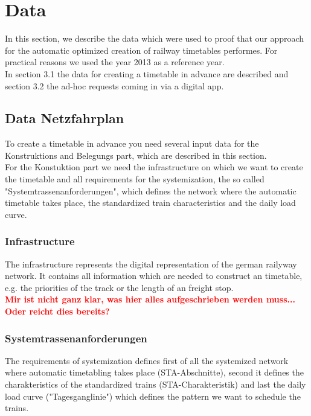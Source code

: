 \section{Data}
\label{chap:data}
In this section, we describe the data which were used to proof that our approach for the automatic optimized creation of railway timetables performes. For practical reasons we used the year 2013 as a reference year.\\
In section 3.1 the data for creating a timetable in advance are described and section 3.2 the ad-hoc requests coming in via a digital app.

\subsection{Data Netzfahrplan}
\label{chap:dataFinVe}
To create a timetable in advance you need several input data for the Konstruktions and Belegungs part, which are described in this section. \\
For the Konstuktion part we need the infrastructure on which we want to create the timetable and all requirements for the systemization, the so called "Systemtrassenanforderungen", which defines the network where the automatic timetable takes place, the standardized train characteristics and the daily load curve. 

\subsubsection{Infrastructure}
The infrastructure represents the digital representation of the german railyway network. It contains all information which are needed to construct an timetable, e.g. the priorities of the track or the length of an freight stop.\\
\textbf{\textcolor{red}{Mir ist nicht ganz klar, was hier alles aufgeschrieben werden muss... Oder reicht dies bereits?}}

\subsubsection{Systemtrassenanforderungen}
The requirements of systemization defines first of all the systemized network where automatic timetabling takes place (STA-Abschnitte), second it defines the charakteristics of the standardized trains (STA-Charakteristik) and last the daily load curve ("Tagesganglinie") which defines the pattern we want to schedule the trains.

